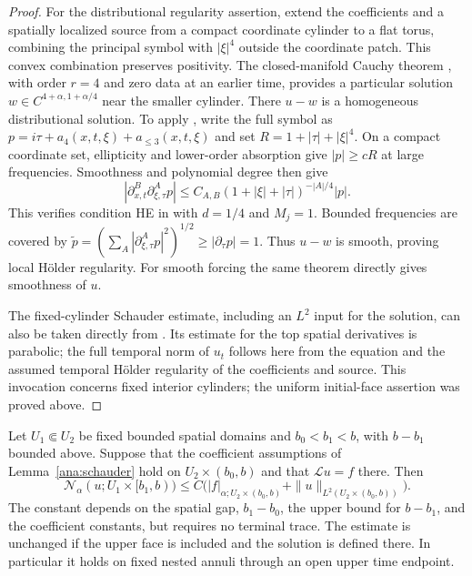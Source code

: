 \begin{proof}
For the distributional regularity assertion, extend the coefficients
and a spatially localized source from a compact coordinate cylinder
to a flat torus, combining the principal symbol with $|\xi|^4$
outside the coordinate patch.  This convex combination preserves
positivity.  The closed-manifold Cauchy theorem
\cite[Theorem~2.4]{Huang2026}, with order $r=4$ and zero data at
an earlier time, provides a particular solution
$w\in C^{4+\alpha,1+\alpha/4}$ near the smaller cylinder.
There $u-w$ is a homogeneous distributional solution.
To apply \cite[Theorem~5.1]{Hormander1961}, write the full symbol as
$p=i\tau+a_4(x,t,\xi)+a_{\le3}(x,t,\xi)$ and set
$R=1+|\tau|+|\xi|^4$.  On a compact coordinate set, ellipticity
and lower-order absorption give $|p|\ge cR$ at large frequencies.
Smoothness and polynomial degree then give
\[
 |\partial_{x,t}^{B}\partial_{\xi,\tau}^{A}p|
 \le C_{A,B}(1+|\xi|+|\tau|)^{-|A|/4}|p|.
\]
This verifies condition HE in
\cite[Equations~(3.1)' and~(3.2)]{Hormander1961}
with $d=1/4$ and $M_j=1$.  Bounded frequencies are covered by
$\widetilde p=(\sum_A|\partial_{\xi,\tau}^Ap|^2)^{1/2}
\ge|\partial_\tau p|=1$.
Thus $u-w$ is smooth, proving local H\"older regularity.
For smooth forcing the same theorem directly gives smoothness of $u$.

The fixed-cylinder
Schauder estimate, including an $L^2$ input for the solution, can
also be taken directly from \cite[Theorem~2.2\textup{(I)}]{DongZhang2015}.
Its estimate for the top spatial derivatives is parabolic;
the full temporal norm of $u_t$ follows here from the equation
and the assumed temporal H\"older regularity of the coefficients
and source.  This invocation concerns fixed interior cylinders;
the uniform initial-face assertion was proved above.
\end{proof}

\begin{lemma}\label{ana:l2}
Let $U_1\Subset U_2$ be fixed bounded spatial domains and
$b_0<b_1<b$, with $b-b_1$ bounded above.  Suppose that the
coefficient assumptions of Lemma~\ref{ana:schauder} hold on
$U_2\times(b_0,b)$ and that $\mathcal Lu=f$ there.  Then
\begin{equation}\label{ana:l2-estimate}
 \mathcal N_\alpha(u;U_1\times[b_1,b))
 \le C\bigl(|f|_{\alpha;U_2\times(b_0,b)}
                  +\|u\|_{L^2(U_2\times(b_0,b))}\bigr).
\end{equation}
The constant depends on the spatial gap, $b_1-b_0$, the upper
bound for $b-b_1$, and the coefficient constants, but requires
no terminal trace.  The estimate is unchanged if the upper face
is included and the solution is defined there.  In particular it
holds on fixed nested annuli through an open upper time endpoint.
\end{lemma}

